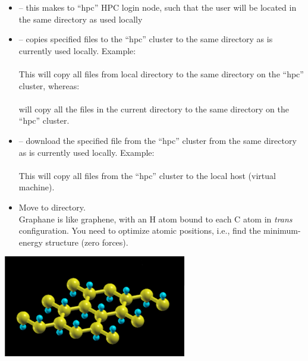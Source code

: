 \documentclass[landscape]{foils}
\begin{document}
{\begin{itemize}
\item {} -- this makes  to ``hpc'' HPC login node,
  such that the user will be located in the same directory as used
  locally
  \vspace{0.5em}
  
\item {} -- copies specified files to the
  ``hpc'' cluster to the same directory as is currently
  used locally. Example:\\[0.5em]
  \\[0.5em]
  This will copy all  files from local directory to the
  same directory on the ``hpc'' cluster, whereas:\\[0.5em]
  \\[0.5em]
  will copy all the files in the current directory to the same
  directory on the ``hpc'' cluster.
  \vspace{0.5em}
  
\item {} -- download the specified file from
  the ``hpc'' cluster from the same directory as is
  currently used locally. Example:\\[0.5em]
  \\[0.5em]
  This will copy all  files from the ``hpc'' cluster to
  the local host (virtual machine).
\end{itemize}
}
\rightheader{}

\parbox{17cm}{
  \begin{itemize}
  \item Move to  directory.\\[0.5em]
    Graphane is like graphene, with an H atom bound to each C atom in
    {\em trans} configuration. You need to optimize atomic positions,
    i.e., find the minimum-energy structure (zero forces).
  \end{itemize}
} \hskip 1cm
\parbox{8cm}{ \includegraphics[width=8cm]{figs/graphane.pdf}}
\end{document}
